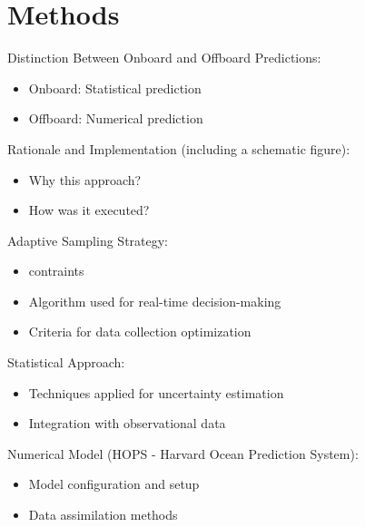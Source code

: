 
\section{Methods}

Distinction Between Onboard and Offboard Predictions:
\begin{itemize}
    \item Onboard: Statistical prediction
    \item Offboard: Numerical prediction
\end{itemize}

Rationale and Implementation (including a schematic figure):
\begin{itemize}
    \item Why this approach?
    \item How was it executed?
\end{itemize}

Adaptive Sampling Strategy:
\begin{itemize}
    \item contraints
    \item Algorithm used for real-time decision-making
    \item Criteria for data collection optimization
\end{itemize}

Statistical Approach:
\begin{itemize}
    \item Techniques applied for uncertainty estimation
    \item Integration with observational data
\end{itemize}

 Numerical Model (HOPS - Harvard Ocean Prediction System):
\begin{itemize}
    \item Model configuration and setup
    \item Data assimilation methods
\end{itemize}


